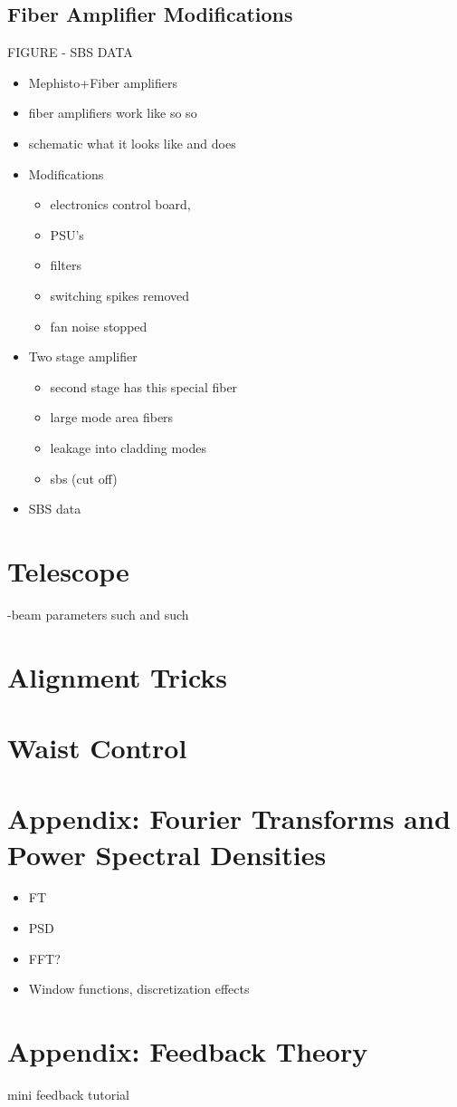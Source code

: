 \documentclass[twocolumn,aps,pra,showpacs,preprintnumbers,bibnotes]{revtex4-1}
\begin{document}
\subsection{Fiber Amplifier Modifications}
FIGURE - SBS DATA
\begin{itemize}
	\item Mephisto+Fiber amplifiers
\item fiber amplifiers work like so so
\item schematic what it looks like and does
\item Modifications
	\begin{itemize}
		\item electronics control board,
		\item PSU's
		\item filters
		\item switching spikes removed
		\item fan noise stopped
	\end{itemize}
\item Two stage amplifier
	\begin{itemize}
		\item second stage has this special fiber 
		\item large mode area fibers
		\item leakage into cladding modes 
		\item sbs (cut off)
	\end{itemize}
\item SBS data
\end{itemize}
\section{Telescope}
-beam parameters such and such

\section{Alignment Tricks}

\section{Waist Control}
\section{Appendix: Fourier Transforms and Power Spectral Densities}
\begin{itemize}
	\item FT
	\item PSD
	\item FFT? 
	\item Window functions, discretization effects
\end{itemize}
\section{Appendix: Feedback Theory}
mini feedback tutorial
\end{document}
